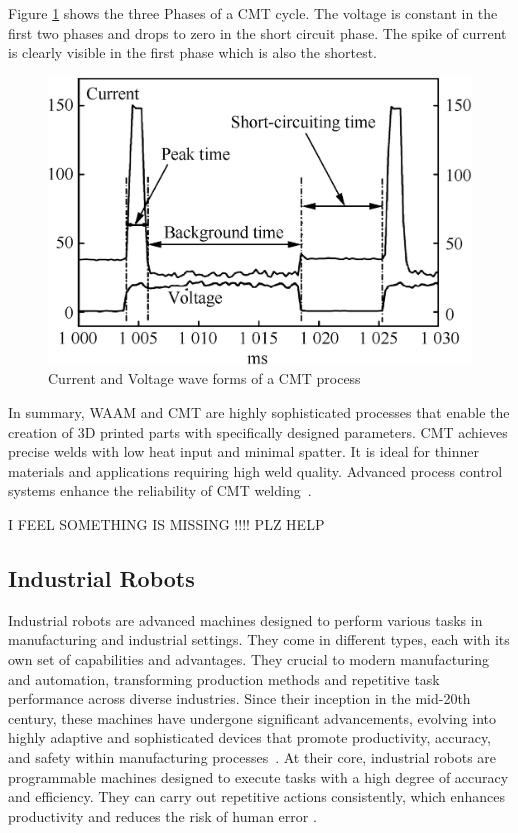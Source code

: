 Figure \ref{fig:CMT} shows the three Phases of a CMT cycle. The voltage is constant in the first two phases and drops to zero in the short circuit phase. The spike of current is clearly visible in the first phase which is also the shortest.

\begin{figure}[h!]
	\centering
	\includegraphics[width=0.6\linewidth]{figures/CMT.jpg}
	\caption{Current and Voltage wave forms of a CMT process~\cite{Selvi.2018}}
	\label{fig:CMT}
\end{figure}

In summary, WAAM and CMT are highly sophisticated processes that enable the creation of 3D printed parts with specifically designed parameters. CMT achieves precise welds with low heat input and minimal spatter. It is ideal for thinner materials and applications requiring high weld quality. Advanced process control systems enhance the reliability of CMT welding~\cite{Rahul.2018, Pickin.2011}.


I FEEL SOMETHING IS MISSING !!!!
PLZ HELP


\subsection{Industrial Robots}\label{IR}
Industrial robots are advanced machines designed to perform various tasks in manufacturing and industrial settings. They come in different types, each with its own set of capabilities and advantages. They crucial to modern manufacturing and automation, transforming production methods and repetitive task performance across diverse industries. Since their inception in the mid-20th century, these machines have undergone significant advancements, evolving into highly adaptive and sophisticated devices that promote productivity, accuracy, and safety within manufacturing processes~\cite{Ji.2019}.
At their core, industrial robots are programmable machines designed to execute tasks with a high degree of accuracy and efficiency. They can carry out repetitive actions consistently, which enhances productivity and reduces the risk of human error \cite{Siciliano.2016}. 

